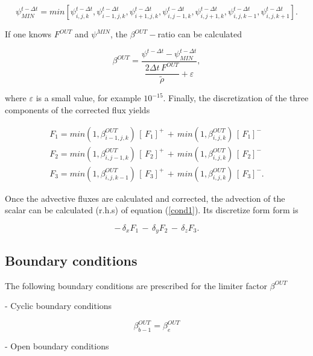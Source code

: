 \begin{equation}
\psi_{MIN}^{t-\Delta {t}}=
min[\psi^{t-\Delta {t}}_{i,j,k},
\psi^{t-\Delta {t}}_{i-1,j,k}, \psi^{t-\Delta {t}}_{i+1,j,k},
\psi^{t-\Delta {t}}_{i,j-1,k}, \psi^{t-\Delta {t}}_{i,j+1,k},
\psi^{t-\Delta {t}}_{i,j,k-1}, \psi^{t-\Delta {t}}_{i,j,k+1}].
\end{equation}

If one knows $F^{OUT}$ and $\psi^{MIN}$, the $\beta^{OUT}-$ratio
can be calculated

\begin{equation}
\beta^{OUT}=
 \dfrac{ \psi^{t-\Delta {t}}- \psi_{MIN}^{t-\Delta {t}}   }
{\dfrac{ {2 \Delta t} \, {F}^{OUT}}{\tilde{\rho}} +\varepsilon },
\end{equation}

\noindent where $\varepsilon$ is a small value, for example $10^{-15}$. Finally,
the discretization of the three components of the corrected flux yields

\begin{eqnarray}
{F_1} = min(1,\beta_{i-1,j,k}^{OUT})\,[\,F_1]^{+}\,+\,
min(1,\beta^{OUT}_{i,j,k})\,[\,F_1]^{-}\\
{F_2} = min(1,\beta_{i,j-1,k}^{OUT})\,[\,F_2]^{+}\,+\,
min(1,\beta^{OUT}_{i,j,k})\,[\,F_2]^{-}\\
{F_3} = min(1,\beta^{OUT}_{i,j,k-1})\,[\,F_3]^{+}\,+\,
min(1,\beta^{OUT}_{i,j,k})\,[\,F_3]^{-}.
\end{eqnarray}

Once the advective fluxes are calculated and corrected, the advection of the
scalar can be calculated (r.h.s) of equation (\ref{cond1}). Its discretize form
form is

\begin{equation}
-\,\delta_{x}F_1\,-\,\delta_{y}F_2\,-\,\delta_{z}F_3.
\end{equation}

\subsection{Boundary conditions}

The following boundary conditions are prescribed for the limiter factor $\beta^{OUT}$

- Cyclic boundary conditions

\begin{equation}
\beta^{OUT}_{b-1}=\beta^{OUT}_{e}
\end{equation}

- Open boundary conditions

